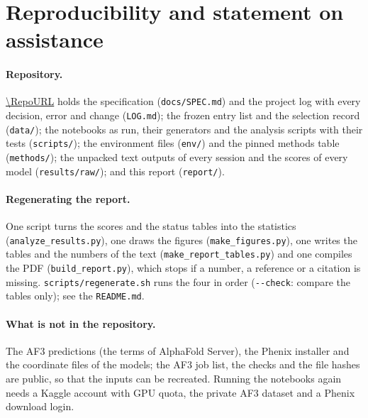 \section{Reproducibility and statement on assistance}\label{sec:repro}
\paragraph{Repository.} \url{\RepoURL} holds the specification (\texttt{docs/SPEC.md}) and the project log with every decision, error and change (\texttt{LOG.md}); the frozen entry list and the selection record (\texttt{data/}); the notebooks as run, their generators and the analysis scripts with their tests (\texttt{scripts/}); the environment files (\texttt{env/}) and the pinned methods table (\texttt{methods/}); the unpacked text outputs of every session and the scores of every model (\texttt{results/raw/}); and this report (\texttt{report/}).
\paragraph{Regenerating the report.} One script turns the scores and the status tables into the statistics (\texttt{analyze\_results.py}), one draws the figures (\texttt{make\_figures.py}), one writes the tables and the numbers of the text (\texttt{make\_report\_tables.py}) and one compiles the PDF (\texttt{build\_report.py}), which stops if a number, a reference or a citation is missing. \texttt{scripts/regenerate.sh} runs the four in order (\texttt{-{}-check}: compare the tables only); see the \texttt{README.md}.
\paragraph{What is not in the repository.} The AF3 predictions (the terms of AlphaFold Server), the Phenix installer and the coordinate files of the models; the AF3 job list, the checks and the file hashes are public, so that the inputs can be recreated. Running the notebooks again needs a Kaggle account with GPU quota, the private AF3 dataset and a Phenix download login.
